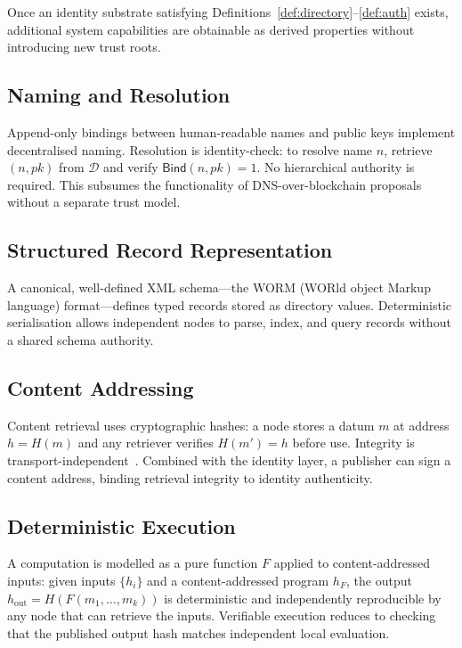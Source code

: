 \documentclass[11pt,a4paper]{article}
\begin{document}
Once an identity substrate satisfying Definitions~\ref{def:directory}--\ref{def:auth} exists, additional
system capabilities are obtainable as derived properties without introducing
new trust roots.

\subsection{Naming and Resolution}

Append-only bindings between human-readable names and public keys implement
decentralised naming.  Resolution is identity-check: to resolve name $n$,
retrieve $(n, pk)$ from $\mathcal{D}$ and verify $\mathsf{Bind}(n, pk) = 1$.
No hierarchical authority is required.  This subsumes the functionality of
DNS-over-blockchain proposals~\cite{handshake} without a separate trust
model.

\subsection{Structured Record Representation}

A canonical, well-defined XML schema---the WORM (WORld object Markup language)
format---defines typed records stored as directory values.  Deterministic
serialisation allows independent nodes to parse, index, and query records
without a shared schema authority.

\subsection{Content Addressing}

Content retrieval uses cryptographic hashes: a node stores a datum $m$ at
address $h = H(m)$ and any retriever verifies $H(m') = h$ before use.
Integrity is transport-independent~\cite{ipfs}.  Combined with the identity
layer, a publisher can sign a content address, binding retrieval integrity to
identity authenticity.

\subsection{Deterministic Execution}

A computation is modelled as a pure function $F$ applied to content-addressed
inputs: given inputs $\{h_i\}$ and a content-addressed program $h_F$, the
output $h_{\mathrm{out}} = H(F(m_1, \ldots, m_k))$ is deterministic and
independently reproducible by any node that can retrieve the inputs.
Verifiable execution reduces to checking that the published output hash
matches independent local evaluation.
\end{document}
